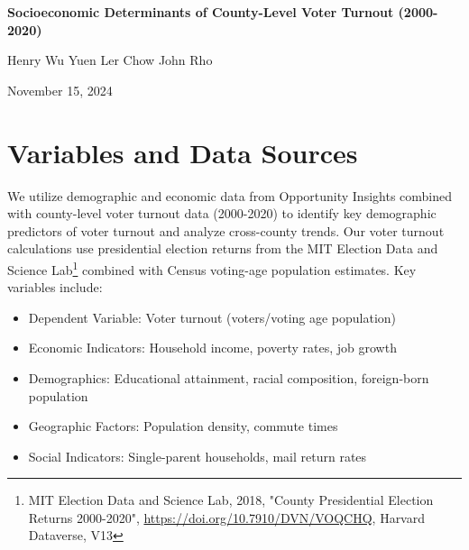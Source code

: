 \documentclass[11pt]{article}
\begin{document}
\begin{center}
    \Large\textbf{Socioeconomic Determinants of County-Level Voter Turnout (2000-2020)}

    \vspace{0.3cm}
    \normalsize
    Henry Wu \quad Yuen Ler Chow \quad John Rho

    \vspace{0.2cm}
    \small
    November 15, 2024
\end{center}

\section*{Variables and Data Sources}
We utilize demographic and economic data from Opportunity Insights combined with county-level voter turnout data (2000-2020) to identify key demographic predictors of voter turnout and analyze cross-county trends. Our voter turnout calculations use presidential election returns from the MIT Election Data and Science Lab\footnote{MIT Election Data and Science Lab, 2018, "County Presidential Election Returns 2000-2020", \url{https://doi.org/10.7910/DVN/VOQCHQ}, Harvard Dataverse, V13} combined with Census voting-age population estimates. Key variables include:
\begin{itemize}\setlength{\itemsep}{0pt}
    \item Dependent Variable: Voter turnout (voters/voting age population)
    \item Economic Indicators: Household income, poverty rates, job growth
    \item Demographics: Educational attainment, racial composition, foreign-born population
    \item Geographic Factors: Population density, commute times
    \item Social Indicators: Single-parent households, mail return rates
\end{itemize}
\end{document}
